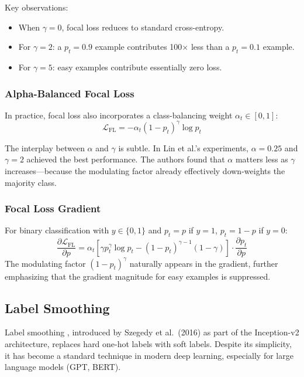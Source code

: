 Key observations:
\begin{itemize}
    \item When $\gamma = 0$, focal loss reduces to standard cross-entropy.
    \item For $\gamma = 2$: a $p_t = 0.9$ example contributes 100$\times$ less than a $p_t = 0.1$ example.
    \item For $\gamma = 5$: easy examples contribute essentially zero loss.
\end{itemize}

\subsubsection{Alpha-Balanced Focal Loss}

In practice, focal loss also incorporates a class-balancing weight $\alpha_t \in [0, 1]$:
\begin{equation}
\mathcal{L}_{\text{FL}} = -\alpha_t (1 - p_t)^\gamma \log p_t
\end{equation}

The interplay between $\alpha$ and $\gamma$ is subtle. In Lin et al.'s experiments, $\alpha = 0.25$ and $\gamma = 2$ achieved the best performance. The authors found that $\alpha$ matters less as $\gamma$ increases---because the modulating factor already effectively down-weights the majority class.

\subsubsection{Focal Loss Gradient}

For binary classification with $y \in \{0, 1\}$ and $p_t = p$ if $y = 1$, $p_t = 1 - p$ if $y = 0$:
\begin{equation}
\frac{\partial \mathcal{L}_{\text{FL}}}{\partial p} = \alpha_t \left[\gamma p_t^\gamma \log p_t - (1 - p_t)^{\gamma - 1}(1 - \gamma)\right] \cdot \frac{\partial p_t}{\partial p}
\end{equation}
The modulating factor $(1 - p_t)^\gamma$ naturally appears in the gradient, further emphasizing that the gradient magnitude for easy examples is suppressed.

\subsection{Label Smoothing}

Label smoothing \cite{szegedy2016rethinking}, introduced by Szegedy et al.\ (2016) as part of the Inception-v2 architecture, replaces hard one-hot labels with soft labels. Despite its simplicity, it has become a standard technique in modern deep learning, especially for large language models (GPT, BERT).

